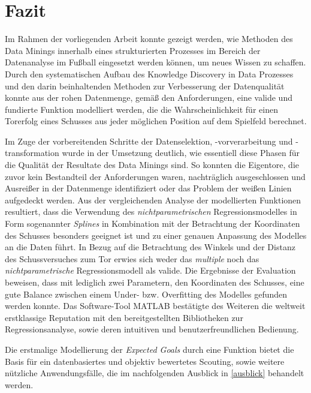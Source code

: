 \section{Fazit}
Im Rahmen der vorliegenden Arbeit konnte gezeigt werden, wie Methoden des Data Minings innerhalb eines strukturierten Prozesses im Bereich der Datenanalyse im Fußball eingesetzt werden können, um neues Wissen zu schaffen. Durch den systematischen Aufbau des Knowledge Discovery in Data Prozesses und den darin beinhaltenden Methoden zur Verbesserung der Datenqualität konnte aus der rohen Datenmenge, gemäß den Anforderungen, eine valide und fundierte Funktion modelliert werden, die die Wahrscheinlichkeit für einen Torerfolg eines Schusses aus jeder möglichen Position auf dem Spielfeld berechnet. 

Im Zuge der vorbereitenden Schritte der Datenselektion, -vorverarbeitung und -transformation wurde in der Umsetzung deutlich, wie essentiell diese Phasen für die Qualität der Resultate des Data Minings sind. So konnten die Eigentore, die zuvor kein Bestandteil der Anforderungen waren, nachträglich ausgeschlossen und Ausreißer in der Datenmenge identifiziert oder das Problem der weißen Linien aufgedeckt werden. Aus der vergleichenden Analyse der modellierten Funktionen resultiert, dass die Verwendung des \textit{nichtparametrischen} Regressionsmodelles in Form sogenannter \textit{Splines} in Kombination mit der Betrachtung der Koordinaten des Schusses besonders geeignet ist und zu einer genauen Anpassung des Modelles an die Daten führt. In Bezug auf die Betrachtung des Winkels und der Distanz des Schussversuches zum Tor erwies sich weder das \textit{multiple} noch das \textit{nichtparametrische} Regressionsmodell als valide. Die Ergebnisse der Evaluation beweisen, dass mit lediglich zwei Parametern, den Koordinaten des Schusses, eine gute Balance zwischen einem Under- bzw. Overfitting des Modelles gefunden werden konnte. Das Software-Tool MATLAB bestätigte des Weiteren die weltweit erstklassige Reputation mit den bereitgestellten Bibliotheken zur Regressionsanalyse, sowie deren intuitiven und benutzerfreundlichen Bedienung. \enlargethispage{2\baselineskip} 

Die erstmalige Modellierung der \textit{Expected Goals} durch eine Funktion bietet die Basis für ein datenbasiertes und objektiv bewertetes Scouting, sowie weitere nützliche Anwendungsfälle, die im nachfolgenden Ausblick in \vref{ausblick} behandelt werden.

